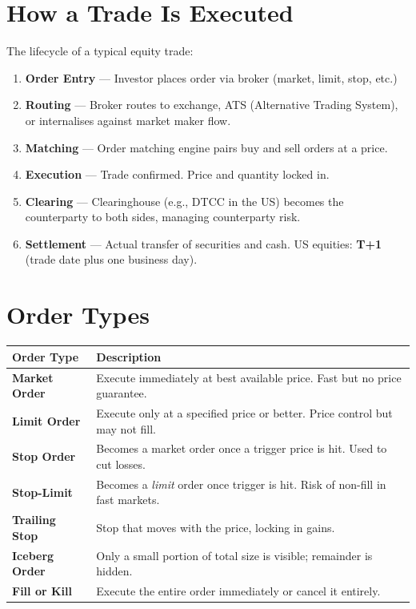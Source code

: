 \section{How a Trade Is Executed}

The lifecycle of a typical equity trade:

\begin{enumerate}[label=\textbf{Step \arabic*.}]
  \item \textbf{Order Entry} — Investor places order via broker (market, limit, stop, etc.)
  \item \textbf{Routing} — Broker routes to exchange, ATS (Alternative Trading System), or
        internalises against market maker flow.
  \item \textbf{Matching} — Order matching engine pairs buy and sell orders at a price.
  \item \textbf{Execution} — Trade confirmed. Price and quantity locked in.
  \item \textbf{Clearing} — Clearinghouse (e.g., DTCC in the US) becomes the counterparty to
        both sides, managing counterparty risk.
  \item \textbf{Settlement} — Actual transfer of securities and cash.
        US equities: \textbf{T+1} (trade date plus one business day).
\end{enumerate}

\section{Order Types}

\begin{center}
\begin{tabular}{>{\bfseries}p{3.5cm} p{9cm}}
\toprule
Order Type & Description \\
\midrule
Market Order & Execute immediately at best available price. Fast but no price guarantee. \\
Limit Order & Execute only at a specified price or better. Price control but may not fill. \\
Stop Order & Becomes a market order once a trigger price is hit. Used to cut losses. \\
Stop-Limit & Becomes a \emph{limit} order once trigger is hit. Risk of non-fill in fast markets. \\
Trailing Stop & Stop that moves with the price, locking in gains. \\
Iceberg Order & Only a small portion of total size is visible; remainder is hidden. \\
Fill or Kill & Execute the entire order immediately or cancel it entirely. \\
\bottomrule
\end{tabular}
\end{center}

